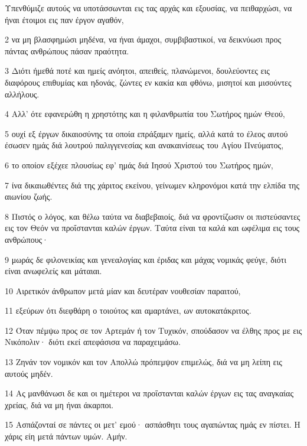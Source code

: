 \par Υπενθύμιζε αυτούς να υποτάσσωνται εις τας αρχάς και εξουσίας, να πειθαρχώσι, να ήναι έτοιμοι εις παν έργον αγαθόν,
\par 2 να μη βλασφημώσι μηδένα, να ήναι άμαχοι, συμβιβαστικοί, να δεικνύωσι προς πάντας ανθρώπους πάσαν πραότητα.
\par 3 Διότι ήμεθά ποτέ και ημείς ανόητοι, απειθείς, πλανώμενοι, δουλεύοντες εις διαφόρους επιθυμίας και ηδονάς, ζώντες εν κακία και φθόνω, μισητοί και μισούντες αλλήλους.
\par 4 Αλλ' ότε εφανερώθη η χρηστότης και η φιλανθρωπία του Σωτήρος ημών Θεού,
\par 5 ουχί εξ έργων δικαιοσύνης τα οποία επράξαμεν ημείς, αλλά κατά το έλεος αυτού έσωσεν ημάς διά λουτρού παλιγγενεσίας και ανακαινίσεως του Αγίου Πνεύματος,
\par 6 το οποίον εξέχεε πλουσίως εφ' ημάς διά Ιησού Χριστού του Σωτήρος ημών,
\par 7 ίνα δικαιωθέντες διά της χάριτος εκείνου, γείνωμεν κληρονόμοι κατά την ελπίδα της αιωνίου ζωής.
\par 8 Πιστός ο λόγος, και θέλω ταύτα να διαβεβαιοίς, διά να φροντίζωσιν οι πιστεύσαντες εις τον Θεόν να προΐστανται καλών έργων. Ταύτα είναι τα καλά και ωφέλιμα εις τους ανθρώπους·
\par 9 μωράς δε φιλονεικίας και γενεαλογίας και έριδας και μάχας νομικάς φεύγε, διότι είναι ανωφελείς και μάταιαι.
\par 10 Αιρετικόν άνθρωπον μετά μίαν και δευτέραν νουθεσίαν παραιτού,
\par 11 εξεύρων ότι διεφθάρη ο τοιούτος και αμαρτάνει, ων αυτοκατάκριτος.
\par 12 Όταν πέμψω προς σε τον Αρτεμάν ή τον Τυχικόν, σπούδασον να έλθης προς με εις Νικόπολιν· διότι εκεί απεφάσισα να παραχειμάσω.
\par 13 Ζηνάν τον νομικόν και τον Απολλώ πρόπεμψον επιμελώς, διά να μη λείπη εις αυτούς μηδέν.
\par 14 Ας μανθάνωσι δε και οι ημέτεροι να προΐστανται καλών έργων εις τας αναγκαίας χρείας, διά να μη ήναι άκαρποι.
\par 15 Ασπάζονταί σε πάντες οι μετ' εμού· ασπάσθητι τους αγαπώντας ημάς εν πίστει. Η χάρις είη μετά πάντων υμών. Αμήν.


